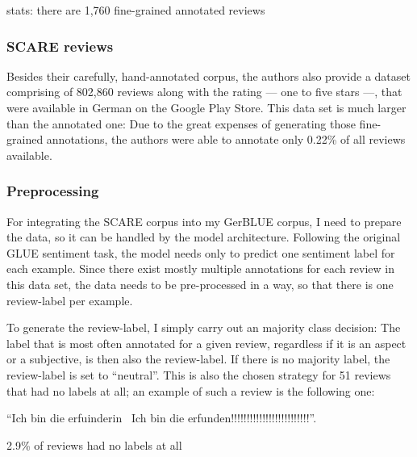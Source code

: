 stats: there are 1,760 fine-grained annotated reviews

\subsubsection{SCARE reviews}

Besides their carefully, hand-annotated corpus, the authors also provide a dataset comprising of 802,860 reviews along with the rating --- one to five stars ---, that were available in German on the Google Play Store.
This data set is much larger than the annotated one: Due to the great expenses of generating those fine-grained annotations, the authors were able to annotate only 0.22\% of all reviews available.


\subsubsection{Preprocessing}

For integrating the SCARE corpus into my GerBLUE corpus, I need to prepare the data, so it can be handled by the model architecture.
Following the original GLUE sentiment task, the model needs only to predict one sentiment label for each example.
Since there exist mostly multiple annotations for each review in this data set, the data needs to be pre-processed in a way, so that there is one review-label per example.

To generate the review-label, I simply carry out an majority class decision:
The label that is most often annotated for a given review, regardless if it is an aspect or a subjective, is then also the review-label.
If there is no majority label, the review-label is set to ``neutral''.
This is also the chosen strategy for 51 reviews that had no labels at all; an example of such a review is the following one: 

\begin{examples}
	\item ``Ich bin die erfuinderin \textbar \textbar\ Ich bin die erfunden!!!!!!!!!!!!!!!!!!!!!!!!!''.
\end{examples}

2.9\% of reviews had no labels at all 

